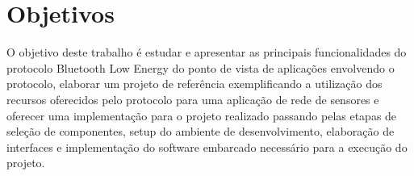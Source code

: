 \section{Objetivos}

O objetivo deste trabalho é estudar e apresentar as principais funcionalidades
do protocolo Bluetooth Low Energy do ponto de vista de aplicações envolvendo o
protocolo, elaborar um projeto de referência exemplificando a utilização dos
recursos oferecidos pelo protocolo para uma aplicação de rede de sensores e
oferecer uma implementação para o projeto realizado passando pelas etapas de
seleção de componentes, setup do ambiente de desenvolvimento, elaboração de
interfaces e implementação do software embarcado necessário para a execução do
projeto.